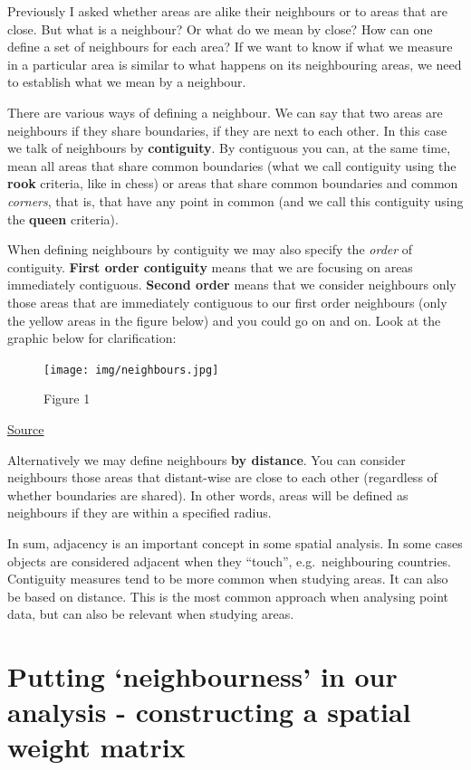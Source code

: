 \documentclass[]{book}
\begin{document}
Previously I asked whether areas are alike their neighbours or to areas that are close. But what is a neighbour? Or what do we mean by close? How can one define a set of neighbours for each area? If we want to know if what we measure in a particular area is similar to what happens on its neighbouring areas, we need to establish what we mean by a neighbour.

There are various ways of defining a neighbour. We can say that two areas are neighbours if they share boundaries, if they are next to each other. In this case we talk of neighbours by \textbf{contiguity}. By contiguous you can, at the same time, mean all areas that share common boundaries (what we call contiguity using the \textbf{rook} criteria, like in chess) or areas that share common boundaries and common \emph{corners}, that is, that have any point in common (and we call this contiguity using the \textbf{queen} criteria).

When defining neighbours by contiguity we may also specify the \emph{order} of contiguity. \textbf{First order contiguity} means that we are focusing on areas immediately contiguous. \textbf{Second order} means that we consider neighbours only those areas that are immediately contiguous to our first order neighbours (only the yellow areas in the figure below) and you could go on and on. Look at the graphic below for clarification:

\begin{figure}
\centering
\texttt{[image: img/neighbours.jpg]}
\caption{Figure 1}
\end{figure}

\href{https://www.slideshare.net/CoreySparks/spatial-statistics-presentation-texas-am-census-rdc}{Source}

Alternatively we may define neighbours \textbf{by distance}. You can consider neighbours those areas that distant-wise are close to each other (regardless of whether boundaries are shared). In other words, areas will be defined as neighbours if they are within a specified radius.

In sum, adjacency is an important concept in some spatial analysis. In some cases objects are considered adjacent when they ``touch'', e.g.~neighbouring countries. Contiguity measures tend to be more common when studying areas. It can also be based on distance. This is the most common approach when analysing point data, but can also be relevant when studying areas.

\hypertarget{putting-neighbourness-in-our-analysis---constructing-a-spatial-weight-matrix}{%
\section{Putting `neighbourness' in our analysis - constructing a spatial weight matrix}\label{putting-neighbourness-in-our-analysis---constructing-a-spatial-weight-matrix}}
\end{document}
